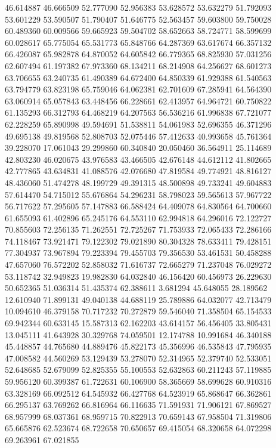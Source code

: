 46.614887
46.666509
52.777090
52.956383
53.628572
53.632279
51.792093
53.601229
53.590507
51.790407
51.646775
52.563457
59.603800
59.750028
60.489360
60.009566
59.665923
59.504702
58.652663
58.724771
58.599699
60.028617
65.775054
65.531773
65.848766
64.287369
63.617674
66.357132
66.426087
65.982878
64.870052
64.605842
66.779365
68.825930
57.031256
62.607494
61.197382
67.973360
68.134211
68.214908
64.256627
68.601273
63.706655
63.240735
61.490389
64.672400
64.850339
61.929388
61.540563
63.794779
63.823198
65.759046
64.062381
62.701609
67.285941
64.564390
63.060914
65.057843
63.448456
66.228661
62.413957
64.964721
60.750822
61.135293
66.312793
64.468219
64.207563
56.536216
61.996838
67.721077
62.228259
65.890998
49.594691
51.538811
54.061983
52.696355
46.371296
49.695138
49.819568
52.808703
52.075446
57.412633
40.993658
45.761364
39.228070
17.061043
29.299860
60.340840
20.050460
36.564911
25.114689
42.803230
46.020675
43.976583
43.466505
42.676148
44.612112
41.802665
42.777865
43.634831
41.088576
42.076680
47.819584
49.774921
48.816127
48.436060
51.474278
48.199729
49.391315
48.500898
49.733241
49.604883
57.614470
54.715012
55.676864
54.296231
58.798023
59.565613
57.967722
56.717622
57.295605
57.147883
66.588424
64.409078
64.830564
64.700660
61.655093
61.402896
65.245176
64.553110
62.994818
64.296016
72.122727
70.855603
72.256135
71.262551
72.725267
71.753933
72.065433
72.286166
74.118467
73.921471
79.122302
79.021890
80.304328
78.633411
79.428151
77.304937
73.967894
79.223394
79.455703
79.356530
53.461531
50.458288
47.657060
76.572202
52.858032
71.616737
72.665279
71.237048
76.029272
53.118742
32.949823
19.982830
64.032840
46.156420
60.456973
26.229630
50.652365
51.036314
51.435374
62.388611
3.681294
45.648055
28.189562
12.610940
71.899131
49.040138
44.688119
25.789886
64.032077
42.713479
10.094610
46.379158
70.717232
70.272879
59.546040
71.358504
65.154533
69.942344
60.633145
15.587313
62.162203
43.614157
56.456405
33.805431
13.045111
41.643928
30.329768
74.059501
12.174788
10.991684
46.340188
45.448857
44.765680
44.889476
45.822173
45.356996
46.535843
47.795935
47.008582
44.560269
53.129439
53.278070
52.314965
52.379740
52.533051
52.648685
52.679099
52.825355
55.100553
52.632863
60.211243
57.119885
59.956120
60.399387
61.722631
60.106900
58.365669
58.699628
60.910316
63.328169
66.092512
64.545932
66.427768
64.523919
65.868647
66.362861
66.295137
63.769262
66.816964
66.116635
71.591931
71.906121
67.869527
68.957999
68.037361
68.959715
70.822913
70.659143
67.958504
71.319806
65.665876
62.523674
68.722658
70.650657
69.415054
68.320658
64.072298
69.263961
67.021855
